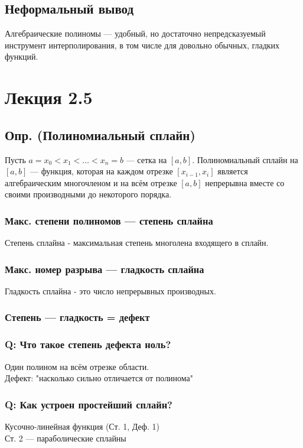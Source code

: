 \subsection*{Неформальный вывод}
Алгебраические полиномы --- удобный, но достаточно непредсказуемый инструмент интерполирования, в том числе для довольно обычных, гладких функций.

\section*{Лекция 2.5}

\subsection*{Опр. (Полиномиальный сплайн)}
Пусть $a = x_0 < x_1 < \ldots < x_n = b$ — сетка на $[a, b]$. Полиномиальный сплайн на $[a, b]$ --- функция, которая на каждом отрезке $[x_{i-1}, x_i]$ является алгебраическим многочленом и на всём отрезке $[a, b]$ непрерывна вместе со своими производными до некоторого порядка.

\subsubsection*{Макс. степени полиномов --- степень сплайна}
Степень сплайна - максимальная степень многолена входящего в сплайн.

\subsubsection*{Макс. номер разрыва --- гладкость сплайна}
Гладкость сплайна - это число непрерывных производных.

\subsubsection*{Степень --- гладкость = дефект}


\subsubsection*{Q: Что такое степень дефекта ноль?}
Один полином на всём отрезке области. \\    
Дефект: "насколько сильно отличается от полинома"

\subsubsection*{Q: Как устроен простейший сплайн?}
Кусочно-линейная функция (Ст. 1, Деф. 1) \\
Ст. 2 --- параболические сплайны

